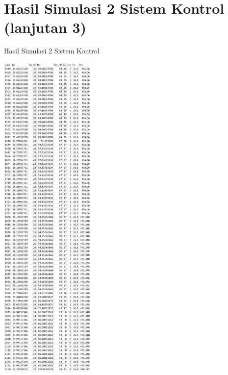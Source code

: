 \section{Hasil Simulasi 2 Sistem Kontrol (lanjutan 3)}
\begin{table}[!h]
	\caption{Hasil Simulasi 2 Sistem Kontrol}
	\label{tbl:A:HasilSimulasiKontrol23}
	\centering
	\includegraphics[width=0.35\textwidth]{figures/HasilSimulasiSimulink23}
\end{table}
\break

